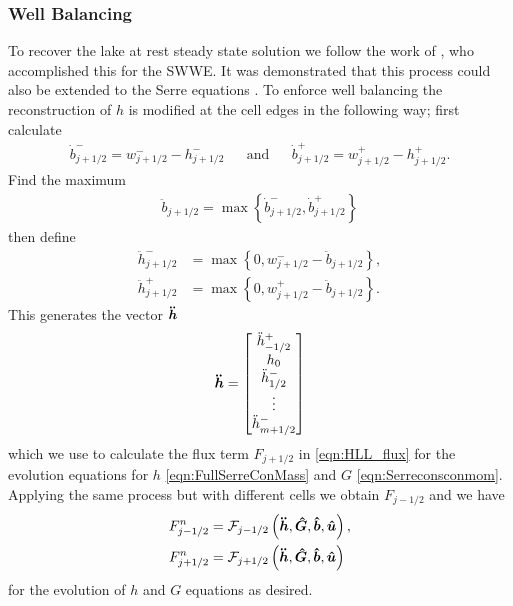 \subsubsection{Well Balancing}
To recover the lake at rest steady state solution we follow the work of \citet{Klein-etal-2004-2050}, who accomplished this for the SWWE. It was demonstrated that this process could also be extended to the Serre equations \cite{Pitt-J-2014}. To enforce well balancing the reconstruction of $h$ is modified at the cell edges in the following way; first calculate
\begin{align}
\dot{b}^-_{j+1/2} = w^-_{j+1/2} - h^-_{j+1/2} & &\text{and}& &\dot{b}^+_{j+1/2} = w^+_{j+1/2} - h^+_{j+1/2}.
\label{eqn:BedReDefWmH}
\end{align}
Find the maximum
\begin{align*}
\ddot{b}_{j+1/2} = \max\left\lbrace\dot{b}^-_{j+1/2} , \dot{b}^+_{j+1/2} \right\rbrace
\end{align*}
then define
\begin{subequations}
\begin{align}
\ddot{h}^-_{j+1/2} &= \max\left\lbrace 0, w^-_{j+1/2} - \ddot{b}_{j+1/2}  \right\rbrace, \\  \ddot{h}^+_{j+1/2} &= \max\left\lbrace 0, w^+_{j+1/2} - \ddot{b}_{j+1/2} \right\rbrace.
\end{align}
\label{eqn:ModifiedHValue}
\end{subequations}
This generates the vector $\boldsymbol{\ddot{h}}$
\begin{equation*}
\boldsymbol{\ddot{h}}= \begin{bmatrix}
\ddot{h}^+_{-1/2} \\ h_0 \\ \ddot{h}^-_{1/2} \\ \vdots  \\ \ddot{h}^-_{m + 1/2} \end{bmatrix}
\end{equation*}
which we use to calculate the flux term $F_{j+1/2}$ in \eqref{eqn:HLL_flux} for the evolution equations for $h$ \eqref{eqn:FullSerreConMass} and $G$ \eqref{eqn:Serreconsconmom}. Applying the same process but with different cells we obtain $F_{j-1/2}$ and we have
\begin{subequations}
\begin{align}	
F^n_{j-1/2} &=\mathcal{F}_{j-1/2} \left(\boldsymbol{\ddot{h}}, \boldsymbol{\hat{G}},\boldsymbol{\hat{b}}, \boldsymbol{\hat{u}}  \right),\\
F^n_{j+1/2} &=\mathcal{F}_{j+1/2} \left(\boldsymbol{\ddot{h}}, \boldsymbol{\hat{G}},\boldsymbol{\hat{b}}, \boldsymbol{\hat{u}}  \right)
\label{eqn:FluxFEVM}
\end{align}
\end{subequations}
for the evolution of $h$ and $G$ equations as desired.

